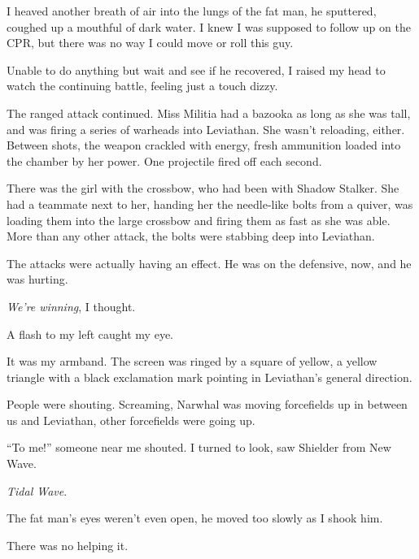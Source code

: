 I heaved another breath of air into the lungs of the fat man, he sputtered, coughed up a mouthful of dark water.  I knew I was supposed to follow up on the CPR, but there was no way I could move or roll this guy.



Unable to do anything but wait and see if he recovered, I raised my head to watch the continuing battle, feeling just a touch dizzy.



The ranged attack continued.  Miss Militia had a bazooka as long as she was tall, and was firing a series of warheads into Leviathan.  She wasn't reloading, either.  Between shots, the weapon crackled with energy, fresh ammunition loaded into the chamber by her power.  One projectile fired off each second.



There was the girl with the crossbow, who had been with Shadow Stalker.  She had a teammate next to her, handing her the needle-like bolts from a quiver, was loading them into the large crossbow and firing them as fast as she was able.  More than any other attack, the bolts were stabbing deep into Leviathan.



The attacks were actually having an effect.  He was on the defensive, now, and he was hurting.



\emph{We're winning}, I thought.



A flash to my left caught my eye.



It was my armband.  The screen was ringed by a square of yellow, a yellow triangle with a black exclamation mark pointing in Leviathan's general direction.



People were shouting.  Screaming, Narwhal was moving forcefields up in between us and Leviathan, other forcefields were going up.



``To me!'' someone near me shouted.  I turned to look, saw Shielder from New Wave.



\emph{Tidal Wave}.



The fat man's eyes weren't even open, he moved too slowly as I shook him.



There was no helping it.




